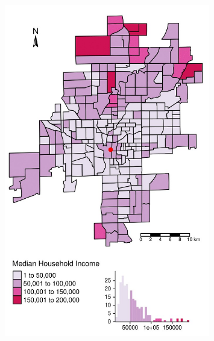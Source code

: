 \documentclass[11pt]{beamer}
\begin{document}
\begin{frame}
\begin{columns}
\begin{column}{0.48\textwidth}
\begin{figure}
\includegraphics[width=0.8\textwidth]{indIncome-1.jpg}
\end{figure}
\end{column}
\end{columns}
\end{frame}
\end{document}
